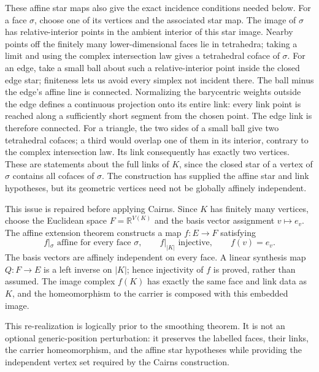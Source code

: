 These affine star maps also give the exact incidence conditions needed
below. For a face $\sigma$, choose one of its vertices and the associated
star map. The image of $\sigma$ has relative-interior points in the
ambient interior of this star image. Nearby points off the finitely many
lower-dimensional faces lie in tetrahedra; taking a limit and using the
complex intersection law gives a tetrahedral coface of $\sigma$. For an
edge, take a small ball about such a relative-interior point inside the
closed edge star; finiteness lets us avoid every simplex not incident
there. The ball minus the edge's affine line is connected. Normalizing
the barycentric weights outside the edge defines a continuous projection
onto its entire link: every
link point is reached along a sufficiently short segment from the chosen
point. The edge link is therefore connected. For a triangle, the two
sides of a small ball give two tetrahedral cofaces; a third would overlap
one of them in its interior, contrary to the complex intersection law.
Its link consequently has exactly two vertices. These are statements
about the full links of $K$, since the closed star of a vertex of
$\sigma$ contains all cofaces of $\sigma$. The construction has supplied
the affine star and link hypotheses, but its geometric vertices need
not be globally affinely independent.

This issue is repaired before applying Cairns.  Since $K$ has finitely many
vertices, choose the Euclidean space $F=\mathbb R^{V(K)}$ and the basis
vector assignment $v\mapsto e_v$.  The affine extension theorem constructs
a map $f:E\to F$ satisfying
\[
 f|_\sigma\text{ affine for every face }\sigma,
 \qquad f|_{|K|}\text{ injective},
 \qquad f(v)=e_v.
\]
The basis vectors are affinely independent on every face.  A linear
synthesis map $Q:F\to E$ is a left inverse on $|K|$; hence injectivity of
$f$ is proved, rather than assumed.  The image complex $f(K)$ has exactly
the same face and link data as $K$, and the homeomorphism to the carrier is
composed with this embedded image.

This re-realization is logically prior to the smoothing theorem.  It is not
an optional generic-position perturbation: it preserves the labelled faces,
their links, the carrier homeomorphism, and the affine star hypotheses while
providing the independent vertex set required by the Cairns construction.

